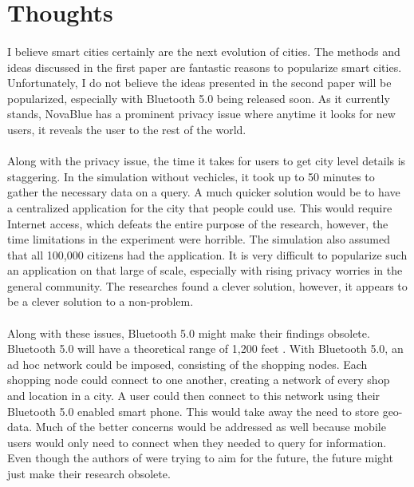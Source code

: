 \documentclass[a4paper,12pt]{article}
\begin{document}
\section*{Thoughts}
\paragraph{}
I believe smart cities certainly are the next evolution of cities. The methods and ideas discussed in the first paper are fantastic reasons to popularize smart cities. Unfortunately, I do not believe the ideas presented in the second paper will be popularized, especially with Bluetooth 5.0 being released soon. As it currently stands, NovaBlue has a prominent privacy issue where anytime it looks for new users, it reveals the user to the rest of the world.
\paragraph{}
Along with the privacy issue, the time it takes for users to get city level details is staggering. In the simulation without vechicles, it took up to 50 minutes to gather the necessary data on a query. A much quicker solution would be to have a centralized application for the city that people could use. This would require Internet access, which defeats the entire purpose of the research, however, the time limitations in the experiment were horrible. The simulation also assumed that all 100,000 citizens had the application. It is very difficult to popularize such an application on that large of scale, especially with rising privacy worries in the general community. The researches found a clever solution, however, it appears to be a clever solution to a non-problem.
\paragraph{}
Along with these issues, Bluetooth 5.0 might make their findings obsolete. Bluetooth 5.0 will have a theoretical range of 1,200 feet \cite{bluetooth}. With Bluetooth 5.0, an ad hoc network could be imposed, consisting of the shopping nodes. Each shopping node could connect to one another, creating a network of every shop and location in a city. A user could then connect to this network using their Bluetooth 5.0 enabled smart phone. This would take away the need to store geo-data. Much of the better concerns would be addressed as well because mobile users would only need to connect when they needed to query for information. Even though the authors of \cite{SC} were trying to aim for the future, the future might just make their research obsolete.
\end{document}
